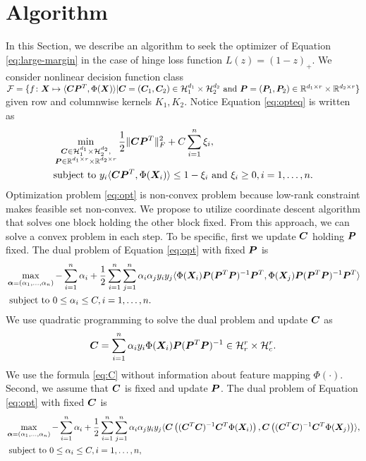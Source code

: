 \documentclass[12pt]{article}
\begin{document}
\section{Algorithm}
\label{sec:alg}
In this Section, we describe an algorithm to seek the optimizer of Equation  \eqref{eq:large-margin} in the case of hinge loss function $L(z) = (1-z)_+$. We consider nonlinear decision function class $\mathcal{F} = \{f\colon\bm X\mapsto\langle\bm C \bm{P}^T,\Phi(\bm X)\rangle|\bm C = (\bm C_1,\bm C_2)\in\mathcal{H}_1^{d_1}\times \mathcal{H}_2^{d_2} \text{ and }\bm{P} = (\bm{P}_1,\bm{P}_2)\in\mathbb{R}^{d_1\times r} \times \mathbb{R}^{d_2\times r}\}$ given row and columnwise kernels $K_1,K_2$.
Notice Equation \eqref{eq:opteq} is written as 
\begin{align}
    \label{eq:opt}
    &\min_{\substack{\bm C\in\mathcal{H}_1^{d_1}\times \mathcal{H}_2^{d_2} ,\\\bm{P}\in\mathbb{R}^{d_1\times r} \times \mathbb{R}^{d_2\times r}}}\frac{1}{2}\lVert\bm C\bm{P}^T\rVert_F^2+ C\sum_{i=1}^n \xi_i,\\
    &\text{subject to } y_i\langle\bm C\bm{P}^T,\Phi(\bm X_i)\rangle\leq 1-\xi_i\text{ and } \xi_i\geq 0, i=1,\ldots,n.
\end{align}
Optimization problem \eqref{eq:opt} is non-convex problem because low-rank constraint makes feasible set non-convex.
We propose to utilize coordinate descent algorithm that solves one block holding the other block fixed. From this approach, we can solve a convex problem in each step.
To be specific, first we update $\bm C$ holding $\bm{P}$ fixed.
The dual problem of Equation \eqref{eq:opt} with fixed $\bm{P}$ is 
\begin{align}
    \label{eq:dual1}
    &\max_{\bm\alpha = (\alpha_1,\ldots,\alpha_n)}-\sum_{i=1}^n\alpha_i + \frac{1}{2}\sum_{i=1}^n\sum_{j=1}^n \alpha_i\alpha_j y_iy_j \langle \Phi(\bm X_i)\bm{P}(\bm{P}^T\bm{P})^{-1}\bm{P}^T,\Phi(\bm X_j)\bm{P}(\bm{P}^T\bm{P})^{-1}\bm{P}^T\rangle\\
    &\text{ subject to }  0\leq \alpha_i\leq C, i=1,\ldots,n.
\end{align}
We use quadratic programming to solve the dual problem and update $\bm C$ as
\begin{align}\label{eq:C}
    \bm C = \sum_{i=1}^n \alpha_iy_i \Phi(\bm X_i) \bm{P}(\bm{P}^T\bm{P})^{-1}\in\mathcal{H}_r^r\times \mathcal{H}_c^r.
\end{align}
We use the formula \eqref{eq:C} without information about feature mapping $\Phi(\cdot)$.
Second, we assume that $\bm C$ is fixed and update $\bm{P}$. The dual problem of Equation \eqref{eq:opt} with fixed $\bm C$ is 
\begin{align}
    \label{eq:dual2}
    &\max_{\bm\alpha = (\alpha_1,\ldots,\alpha_n)}-\sum_{i=1}^n\alpha_i + \frac{1}{2}\sum_{i=1}^n\sum_{j=1}^n \alpha_i\alpha_j y_iy_j\langle 
    \bm C\left((\bm C^T\bm C)^{-1}\bm C^T\Phi(\bm X_i)\right),\bm C\left((\bm C^T\bm C)^{-1}\bm C^T\Phi(\bm X_j)\right)\rangle,\\
    &\text{ subject to }  0\leq \alpha_i\leq C, i=1,\ldots,n,
\end{align}
\end{document}
